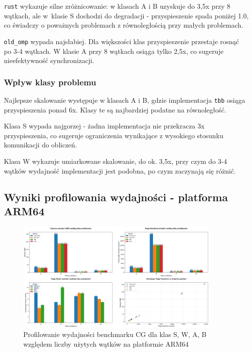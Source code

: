 \texttt{rust} wykazuje silne zróżnicowanie: w klasach A i B uzyskuje do 3,5x przy 8 wątkach, ale w~klasie S dochodzi do degradacji - przyspieszenie spada poniżej 1.0, co świadczy o poważnych problemach z równoległością przy małych problemach.

\texttt{old\_omp} wypada najsłabiej. Dla większości klas przyspieszenie przestaje rosnąć po 3-4 wątkach. W klasie A przy 8 wątkach osiąga tylko 2,5x, co sugeruje nieefektywność synchronizacji.

\subsubsection{Wpływ klasy problemu}
Najlepsze skalowanie występuje w klasach A i B, gdzie implementacja \texttt{tbb} osiąga przyspieszenia ponad 6x. Klasy te są najbardziej podatne na równoległość.

Klasa S wypada najgorzej - żadna implementacja nie przekracza 3x przyspieszenia, co sugeruje ograniczenia wynikające z wysokiego stosunku komunikacji do obliczeń.

Klasa W wykazuje umiarkowane skalowanie, do ok. 3,5x, przy czym do 3-4 wątków wydajność implementacji jest podobna, po czym zaczynają się różnić.
\subsection{Wyniki profilowania wydajności - platforma ARM64}
\begin{figure}[H]
    \centering
    \includegraphics[width=0.9\textwidth]{analiza/images/parallel/cg/arm/chart_01_memory_comparison.png}
    \caption{Profilowanie wydajności benchmarku CG dla klas S, W, A, B względem liczby użytych wątków na platformie ARM64}
    \label{cg_porownanie_zuzycia_pamieci}
\end{figure}

